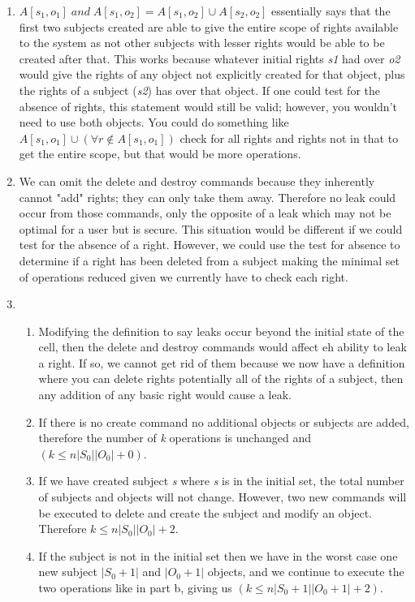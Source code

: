 \documentclass[journal,onecolumn]{IEEEtran}
\begin{document}
\begin{enumerate}
  \item \(A[s_1,o_1] \; and \; A[s_1,o_2] = A[s_1,o_2] \cup A[s_2,o_2]\) essentially says that the first two subjects created are able to give the entire scope of rights available to the system as not other subjects with lesser rights would be able to be created after that. This works because whatever initial rights \textit{s1} had over \textit{o2} would give the rights of any object not explicitly created for that object, plus the rights of a subject (\textit{s2}) has over that object.
  If one could test for the absence of rights, this statement would still be valid; however, you wouldn't need to use both objects. You could do something like \(A[s_1,o_1] \cup (\forall r \not\in A[s_1,o_1])\) check for all rights and rights not in that to get the entire scope, but that would be more operations.
  \item We can omit the delete and destroy commands because they inherently cannot "add" rights; they can only take them away. Therefore no leak could occur from those commands, only the opposite of a leak which may not be optimal for a user but is secure. This situation would be different if we could test for the absence of a right. However, we could use the test for absence to determine if a right has been deleted from a subject making the minimal set of operations reduced given we currently have to check each right. 
  \item 
  \begin{enumerate}
    \item Modifying the definition to say leaks occur beyond the initial state of the cell, then the delete and destroy commands would affect eh ability to leak a right. If so, we cannot get rid of them because we now have a definition where you can delete rights potentially all of the rights of a subject, then any addition of any basic right would cause a leak. 
    \item If there is no create command no additional objects or subjects are added, therefore the number of \textit{k} operations is unchanged and \((k \leq n|S_0||O_0| + 0)\).
    \item If we have created subject \textit{s} where \textit{s} is in the initial set, the total number of subjects and objects will not change. However, two new commands will be executed to delete and create the subject and modify an object. Therefore \(k \leq n|S_0||O_0| + 2\).
    \item If the subject is not in the initial set then we have in the worst case one new subject \(|S_0 + 1|\) and \(|O_0 + 1|\) objects, and we continue to execute the two operations like in part b, giving us \((k \leq n|S_0 + 1||O_0 + 1| + 2)\).

\end{enumerate}
\end{enumerate}
\end{document}
